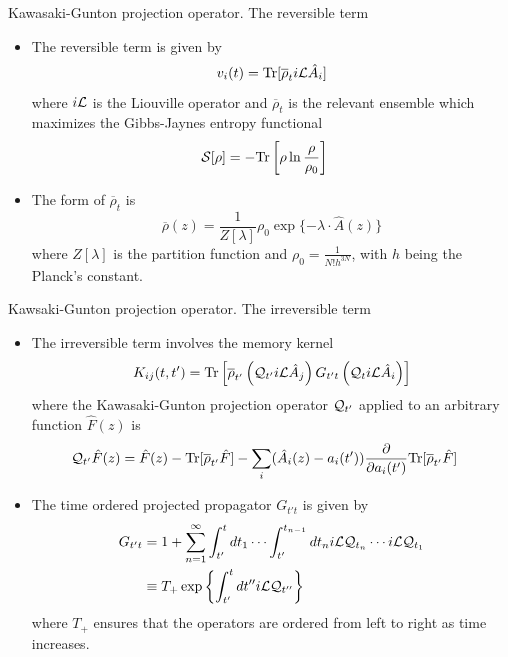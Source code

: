 \documentclass{beamer}
\begin{document}
\begin{frame}{Kawasaki-Gunton projection operator. The reversible term}
\begin{itemize}
  \item The reversible term is given by
\begin{equation}
  v_i(t) = {\rm Tr}[\overline{\rho}_t  i{\cal L} \hat{A}_i]
  \nonumber
\end{equation}
where $i{\cal L}$ is the Liouville operator and $\overline{\rho}_t$ is the \alert{relevant ensemble} which maximizes the Gibbs-Jaynes entropy functional
\begin{align}
 {\cal S}[\rho]&=-{\rm Tr}\left[\rho\ln\frac{\rho}{\rho_0}\right]
\nonumber
\label{entropy}
\end{align}

\item The form of $\overline{\rho}_t$ is
\begin{equation}
\overline{\rho}(z) = \frac{1}{Z[\lambda]} \rho_0\exp\{-\lambda\!\cdot\!\hat{A}(z)\}
\nonumber
\end{equation}
where $Z[\lambda]$ is the partition function and $\rho_0=\frac{1}{N!h^{3N}}$,   with  $h$  being   the  Planck's constant.
\end{itemize}
\end{frame}

\begin{frame}{Kawsaki-Gunton projection operator. The irreversible term}
\begin{itemize}
    \item The irreversible
      term involves the \alert{memory kernel}
\begin{equation}
K_{ij}(t,t') =
{\rm Tr}\left[\overline{\rho}_{t'} 
  \left({\cal Q}_{t'} i{\cal L}\hat{A}_j\right) G_{t't}
\left({\cal Q}_{t } i{\cal L}\hat{A}_i\right)\right]
\nonumber
\label{ker}
\end{equation}
where   the  Kawasaki-Gunton   projection  operator   ${\cal  Q}_{t'}$
applied  to an  arbitrary  function
$\hat{F}(z)$ is
\begin{align}
  {\cal Q}_{t'}\hat{F}(z) &= \hat{F}(z)- {\rm Tr}[\overline{\rho}_{t'} \hat{F}]
-\sum_i(\hat{A}_i(z)-a_i(t'))\frac{\partial }{\partial a_i(t')}
{\rm Tr}[\overline{\rho}_{t'} \hat{F}]
\label{Q}
\nonumber
\end{align}

\item The time ordered projected propagator $G_{t't}$ is given by
\begin{align}
  G_{t't}&=1
+\sum_{n=1}^\infty \int_{t'}^tdt_1\cdots\int_{t'}^{t_{n-1}}dt_n
i{\cal L}{\cal Q}_{t_n}\cdots  i{\cal L}{\cal Q}_{t_1}
\nonumber\\
&\equiv T_+\exp\left\{\int_{t'}^t dt''  i{\cal L}{\cal Q}_{t''}\right\}
\nonumber
\end{align}
where $T_+$ ensures that the operators are ordered from left to right as time increases.
\end{itemize}
  
\end{frame}
\end{document}
